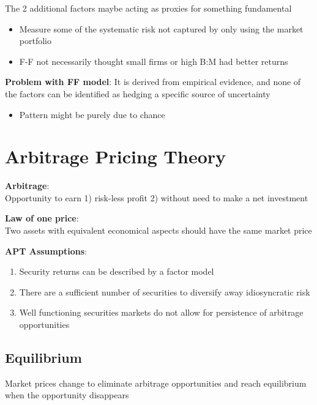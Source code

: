 \documentclass[]{book}
\providecommand{\tightlist}{%
  \setlength{\itemsep}{0pt}\setlength{\parskip}{0pt}}
\theoremstyle{definition}
\theoremstyle{definition}
\theoremstyle{remark}
\begin{document}
The 2 additional factors maybe acting as proxies for something
fundamental

\begin{itemize}
\item
  Measure some of the systematic risk not captured by only using the
  market portfolio
\item
  F-F not necessarily thought small firms or high B:M had better returns
\end{itemize}

\textbf{Problem with FF model}: It is derived from empirical evidence,
and none of the factors can be identified as hedging a specific source
of uncertainty

\begin{itemize}
\tightlist
\item
  Pattern might be purely due to chance
\end{itemize}

\section{Arbitrage Pricing Theory}\label{arbitrage-pricing-theory}

\textbf{Arbitrage}:\\
Opportunity to earn 1) risk-less profit 2) without need to make a net
investment

\textbf{Law of one price}:\\
Two assets with equivalent economical aspects should have the same
market price

\textbf{APT Assumptions}:

\begin{enumerate}
\def\labelenumi{\arabic{enumi})}
\item
  Security returns can be described by a factor model
\item
  There are a sufficient number of securities to diversify away
  idiosyncratic risk
\item
  Well functioning securities markets do not allow for persistence of
  arbitrage opportunities
\end{enumerate}

\subsection{Equilibrium}\label{equilibrium}

Market prices change to eliminate arbitrage opportunities and reach
equilibrium when the opportunity disappears
\end{document}
